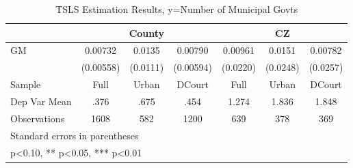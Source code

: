 \begin{table}[htbp]\centering
\def\sym#1{\ifmmode^{#1}\else\(^{#1}\)\fi}
\caption{TSLS Estimation Results, y=Number of Municipal Govts}
\begin{tabular}{l*{6}{c}}
\toprule
                &\multicolumn{3}{c}{County}            &\multicolumn{3}{c}{CZ}                \\\cmidrule(lr){2-4}\cmidrule(lr){5-7}
\midrule
GM              &  0.00732   &   0.0135   &  0.00790   &  0.00961   &   0.0151   &  0.00782   \\
                &(0.00558)   & (0.0111)   &(0.00594)   & (0.0220)   & (0.0248)   & (0.0257)   \\
\midrule
Sample          &     Full   &    Urban   &   DCourt   &     Full   &    Urban   &   DCourt   \\
Dep Var Mean    &     .376   &     .675   &     .454   &    1.274   &    1.836   &    1.848   \\
Observations    &     1608   &      582   &     1200   &      639   &      378   &      369   \\
\bottomrule
\multicolumn{7}{l}{\footnotesize Standard errors in parentheses}\\
\multicolumn{7}{l}{\footnotesize * p<0.10, ** p<0.05, *** p<0.01}\\
\end{tabular}
\end{table}
